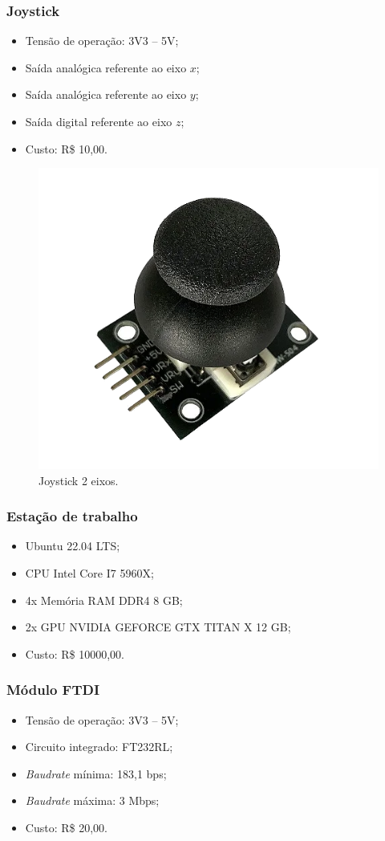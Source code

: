 \clearpage

\subsubsection*{Joystick}
	
	\begin{itemize}
		\item Tensão de operação: 3V3 -- 5V;
		\item Saída analógica referente ao eixo $x$;
		\item Saída analógica referente ao eixo $y$;
		\item Saída digital referente ao eixo $z$;
		\item Custo: R\$ 10,00.
	\end{itemize}



\begin{figure}[!h]
\centering
\includegraphics[width=0.3\linewidth]{img/joystick}
\caption{Joystick 2 eixos.}
\label{fig:joystick}
\end{figure}

\subsubsection*{Estação de trabalho}

\begin{itemize}
	\item Ubuntu 22.04 LTS;
	\item CPU Intel Core I7 5960X;
	\item 4x Memória RAM DDR4 8 GB;
	\item 2x GPU NVIDIA GEFORCE GTX TITAN X 12 GB;
	\item Custo: R\$ 10000,00.
\end{itemize}

\subsubsection*{Módulo FTDI}

\begin{itemize}
	\item Tensão de operação: 3V3 -- 5V;
	\item Circuito integrado: FT232RL;
	\item \textit{Baudrate} mínima: 183,1 bps;
	\item \textit{Baudrate} máxima: 3 Mbps;
	\item Custo: R\$ 20,00.
\end{itemize}

